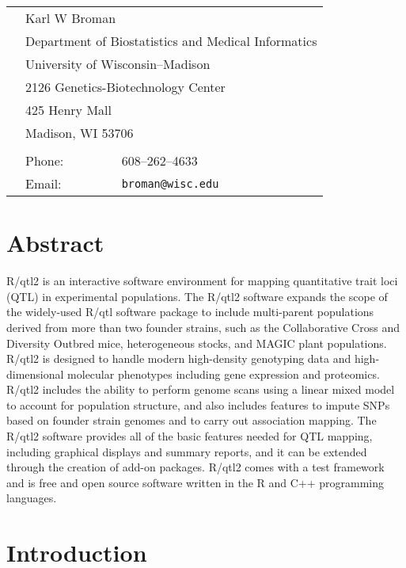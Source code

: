 \documentclass[12pt,letterpaper]{article}
\begin{document}
\begin{tabular}{lll}
 \\
 \hspace{1cm} & \multicolumn{2}{l}{Karl W Broman} \\
 & \multicolumn{2}{l}{Department of Biostatistics and Medical Informatics} \\
 & \multicolumn{2}{l}{University of Wisconsin--Madison} \\
 & \multicolumn{2}{l}{2126 Genetics-Biotechnology Center} \\
 & \multicolumn{2}{l}{425 Henry Mall} \\
 & \multicolumn{2}{l}{Madison, WI 53706} \\
 \\
 & Phone: & 608--262--4633 \\
 & Email: & \verb|broman@wisc.edu|
\end{tabular}


\newpage

\section*{Abstract}

R/qtl2 is an interactive software environment for mapping quantitative
trait loci (QTL) in experimental populations. The R/qtl2 software
expands the scope of the widely-used R/qtl software package to include
multi-parent populations derived from more than two founder strains,
such as the Collaborative Cross and Diversity Outbred mice,
heterogeneous stocks, and MAGIC plant populations. R/qtl2 is designed
to handle modern high-density genotyping data and high-dimensional
molecular phenotypes including gene expression and proteomics. R/qtl2
includes the ability to perform genome scans using a linear mixed
model to account for population structure, and also includes features
to impute SNPs based on founder strain genomes and to carry out
association mapping. The R/qtl2 software provides all of the basic
features needed for QTL mapping, including graphical displays and
summary reports, and it can be extended through the creation of add-on
packages. R/qtl2 comes with a test framework and is free and open
source software written in the R and C++ programming languages.

\newpage

\section*{Introduction}
\end{document}

